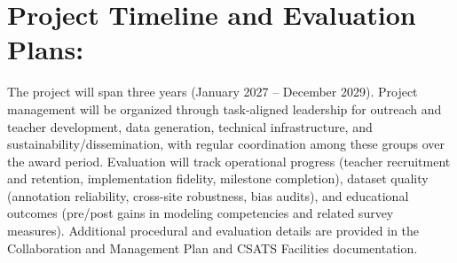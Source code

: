 \documentclass[11pt]{article}
\begin{document}

\section{Project Timeline and Evaluation Plans:}

The project will span three years (January 2027 – December 2029).
Project management will be organized through task-aligned leadership for outreach and teacher development, data generation, technical infrastructure, and sustainability/dissemination, with regular coordination among these groups over the award period.
Evaluation will track operational progress (teacher recruitment and retention, implementation fidelity, milestone completion), dataset quality (annotation reliability, cross-site robustness, bias audits), and educational outcomes (pre/post gains in modeling competencies and related survey measures).
Additional procedural and evaluation details are provided in the Collaboration and Management Plan and CSATS Facilities documentation.
\end{document}
